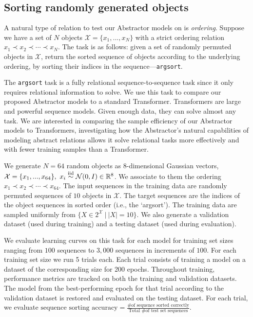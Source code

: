 \subsection{Sorting randomly generated objects}
\label{ssec:random_object_argsort}
\def\subtask#1{\noindent{\it\bfseries #1.}}


A natural type of relation to test our Abstractor models on is \textit{ordering}. Suppose we have a set of $N$ objects $\mathcal{X} = \{ x_1 , ..., x_N \}$ with a strict ordering relation $x_1 \prec x_2 \prec \cdots \prec x_N$. The task is as follows: given a set of randomly permuted objects in $\mathcal{X}$, return the sorted sequence of objects according to the underlying ordering, by sorting their indices in the sequence---\texttt{argsort}.

The \texttt{argsort} task is a fully relational sequence-to-sequence task since it only requires relational information to solve. We use this task to compare our proposed Abstractor models to a standard Transformer. Transformers are large and powerful sequence models. Given enough data, they can solve almost any task. We are interested in comparing the sample efficiency of our Abstractor models to Transformers, investigating how the Abstractor's natural capabilities of modeling abstract relations allows it solve relational tasks more effectively and with fewer training samples than a Transformer.

\subtask{Random object sorting task} We generate $N=64$ random objects as 8-dimensional Gaussian vectors, $\mathcal{X} = \{ x_1 , ..., x_{64} \}, \ x_i \overset{\mathrm{iid}}{\sim} \mathcal{N}(0, I) \in \mathbb{R}^8$. We associate to them the ordering $x_1 \prec x_2 \prec \cdots \prec x_{64}$. The input sequences in the training data are randomly permuted sequences of $10$ objects in $\mathcal{X}$. The target sequences are the indices of the object sequences in sorted order (i.e., the `argsort'). The training data are sampled uniformly from $\{ X \in 2^\mathcal{X} \ \vert \ |X| = 10\}$. We also generate a validation dataset (used during training) and a testing dataset (used during evaluation).

\subtask{Evaluation} We evaluate learning curves on this task for each model for training set sizes ranging from $100$ sequences to $3,000$ sequences in increments of $100$. For each training set size we run 5 trials each. Each trial consists of training a model on a dataset of the corresponding size for 200 epochs. Throughout training, performance metrics are tracked on both the training and validation datasets. The model from the best-performing epoch for that trial according to the validation dataset is restored and evaluated on the testing dataset. For each trial, we evaluate $\text{sequence sorting accuracy} = \frac{\text{\# of sequence sorted correctly}}{\text{Total \# of test set sequences}}$.

